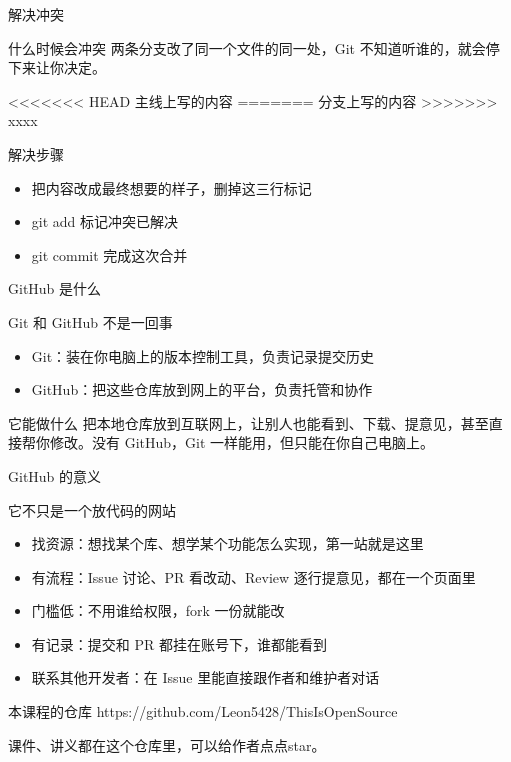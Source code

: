 \documentclass[aspectratio=169]{beamer}
\begin{document}
\begin{frame}[fragile]{解决冲突}
	\begin{block}{什么时候会冲突}
		两条分支改了同一个文件的同一处，Git 不知道听谁的，就会停下来让你决定。
		\vspace{-0.8em}
\begin{semiverbatim}
<<<<<<< HEAD
主线上写的内容
=======
分支上写的内容
>>>>>>> xxxx
\end{semiverbatim}
	\end{block}
	\begin{block}{解决步骤}
		\begin{itemize}
			\item 把内容改成最终想要的样子，删掉这三行标记
			\item git add 标记冲突已解决
			\item git commit 完成这次合并
		\end{itemize}
	\end{block}
\end{frame}

\begin{frame}{GitHub 是什么}
	\begin{block}{Git 和 GitHub 不是一回事}
		\begin{itemize}
			\item Git：装在你电脑上的版本控制工具，负责记录提交历史
			\item GitHub：把这些仓库放到网上的平台，负责托管和协作
		\end{itemize}
	\end{block}
	\begin{block}{它能做什么}
		\hspace*{2em}把本地仓库放到互联网上，让别人也能看到、下载、提意见，甚至直接帮你修改。没有 GitHub，Git 一样能用，但只能在你自己电脑上。
	\end{block}
\end{frame}

\begin{frame}{GitHub 的意义}
	\begin{block}{它不只是一个放代码的网站}
		\begin{itemize}
			\item 找资源：想找某个库、想学某个功能怎么实现，第一站就是这里
			\item 有流程：Issue 讨论、PR 看改动、Review 逐行提意见，都在一个页面里
			\item 门槛低：不用谁给权限，fork 一份就能改
			\item 有记录：提交和 PR 都挂在账号下，谁都能看到
			\item 联系其他开发者：在 Issue 里能直接跟作者和维护者对话
		\end{itemize}
	\end{block}
	\begin{block}{本课程的仓库}
https://github.com/Leon5428/ThisIsOpenSource

课件、讲义都在这个仓库里，可以给作者点点star。
\end{block}
\end{frame}
\end{document}
